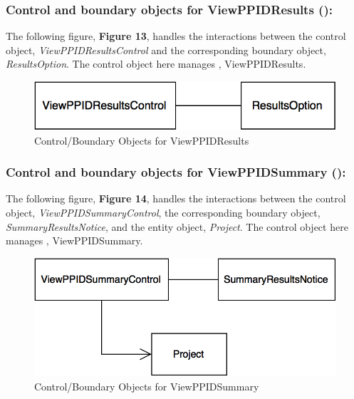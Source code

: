\documentclass[12pt,letterpaper]{article}
\begin{document}
\newpage{}

\subsubsection*{Control and boundary objects for ViewPPIDResults (\viewppidresults{}):}

The following figure, {\bf Figure 13}, handles the interactions between the control object, {\it ViewPPIDResultsControl} and the corresponding boundary object, 
{\it ResultsOption}. The control object here manages \viewppidresults{}, ViewPPIDResults.

\vspace{1em}

\begin{figure}[H]
	\centering{}
	\includegraphics[scale=0.37]{imgs/cbod/view-ppid-results.png}
	\caption{Control/Boundary Objects for ViewPPIDResults}
\end{figure}

\subsubsection*{Control and boundary objects for ViewPPIDSummary (\viewppidsummary{}):}

The following figure, {\bf Figure 14}, handles the interactions between the control object, {\it ViewPPIDSummaryControl}, the corresponding boundary object, 
{\it SummaryResultsNotice}, and the entity object, {\it Project}. The control object here manages \viewppidsummary{}, ViewPPIDSummary.

\vspace{1em}

\begin{figure}[H]
	\centering{}
	\includegraphics[scale=0.37]{imgs/cbod/view-ppid-summary.png}
	\caption{Control/Boundary Objects for ViewPPIDSummary}
\end{figure}
\end{document}
